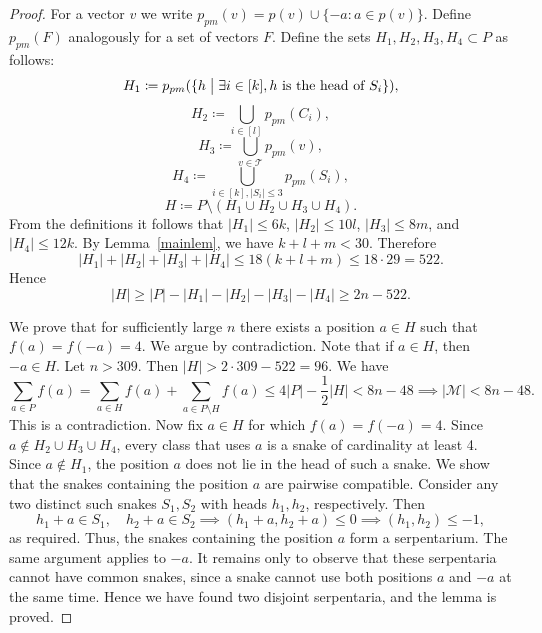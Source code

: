 \documentclass[10pt,a4paper]{amsart}
\newcommand{\M}{\mathcal{M}}
\newcommand{\T}{\mathcal{T}}
\begin{document}
\begin{proof}
    For a vector $v$ we write $p_{pm}(v)=p(v)\cup\{-a:a\in p(v)\}$. Define $p_{pm}(F)$ analogously for a set of vectors $F$.
    Define the sets $H_1,H_2,H_3,H_4 \subset P$ as follows:
    \[
    H_1 \coloneqq p_{pm}(\{h \bigm| \exists i \in [k], h   \text{ is the head of } S_i\}),
    \]
    \[
    H_2 \coloneqq \bigcup_{i\in [l]} p_{pm}(C_i),
    \]
    \[
    H_3 \coloneqq \bigcup_{v \in \T} p_{pm}(v),
    \]
    \[
    H_4 \coloneqq \bigcup_{i \in [k], |S_i| \leqslant 3} p_{pm}(S_i),
    \]
    \[
    H \coloneqq P \setminus (H_1 \cup H_2 \cup H_3 \cup H_4).
    \]
    From the definitions it follows that $|H_1| \leqslant 6k$, $|H_2| \leqslant 10l$, $|H_3| \leqslant 8m$, and $|H_4| \leqslant 12k$. By Lemma~\ref{mainlem}, we have $k+l+m<30$. Therefore
    $$|H_1|+|H_2|+|H_3|+|H_4| \leqslant 18(k+l+m) \leqslant 18\cdot29=522.$$
    Hence
    $$|H| \geqslant |P|-|H_1|-|H_2|-|H_3|-|H_4| \geqslant 2n-522.$$

    We prove that for sufficiently large $n$ there exists a position $a \in H$ such that $f(a)=f(-a)=4$. We argue by contradiction. Note that if $a \in H$, then $-a \in H$. Let $n>309$. Then $|H|>2\cdot309-522=96$. We have
    \[
    \sum_{a\in P} f(a) = \sum_{a\in H} f(a) + \sum_{a\in P \setminus H} f(a)
    \leqslant
    4|P| - \frac{1}{2}|H| < 8n-48 \implies |\M|<8n-48.
    \]
    This is a contradiction. Now fix $a\in H$ for which $f(a)=f(-a)=4$. Since $a\notin H_2\cup H_3\cup H_4$, every class that uses $a$ is a snake of cardinality at least 4. Since $a\notin H_1$, the position $a$ does not lie in the head of such a snake. We show that the snakes containing the position $a$ are pairwise compatible. Consider any two distinct such snakes $S_1,S_2$ with heads $h_1,h_2$, respectively. Then
    $$h_1+a\in S_1, \quad h_2+a\in S_2 \implies (h_1+a,h_2+a)\leqslant 0 \implies (h_1,h_2)\leqslant -1,$$
    as required. Thus, the snakes containing the position $a$ form a serpentarium. The same argument applies to $-a$. It remains only to observe that these serpentaria cannot have common snakes, since a snake cannot use both positions $a$ and $-a$ at the same time. Hence we have found two disjoint serpentaria, and the lemma is proved.
\end{proof}
\end{document}
